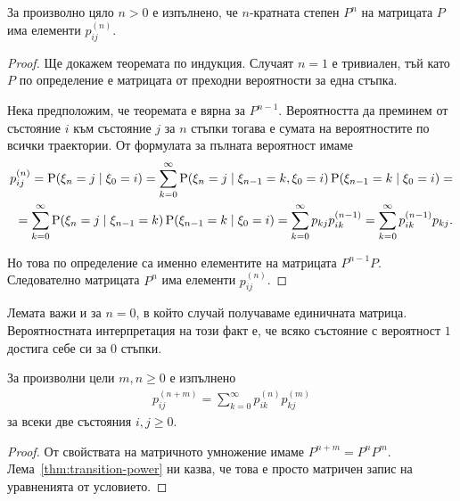 \documentclass[numbers=endperiod, bibliography=totocnumbered]{scrartcl}
\begin{document}
\begin{lemma}\label{thm:transition-power}
  За произволно цяло \( n > 0 \) е изпълнено, че \( n \)-кратната степен \( P^n \) на матрицата \( P \) има елементи \( p_{ij}^{(n)} \).
\end{lemma}
\begin{proof}
  Ще докажем теоремата по индукция. Случаят \( n = 1 \) е тривиален, тъй като \( P \) по определение е матрицата от преходни вероятности за една стъпка.

  Нека предположим, че теоремата е вярна за \( P^{n-1} \). Вероятността да преминем от състояние \( i \) към състояние \( j \) за \( n \) стъпки тогава е сумата на вероятностите по всички траектории. От формулата за пълната вероятност имаме
  \begin{align*}
    p^{(n)}_{ij}
    =
    \operatorname{P}(\xi_n = j \mid \xi_0 = i)
    =
    \sum_{k=0}^\infty \operatorname{P}(\xi_n = j \mid \xi_{n-1} = k, \xi_0 = i) \operatorname{P}(\xi_{n-1} = k \mid \xi_0 = i)
    = \\ =
    \sum_{k=0}^\infty \operatorname{P}(\xi_n = j \mid \xi_{n-1} = k) \operatorname{P}(\xi_{n-1} = k \mid \xi_0 = i)
    =
    \sum_{k=0}^\infty p_{kj} p^{(n-1)}_{ik}
    =
    \sum_{k=0}^\infty p^{(n-1)}_{ik} p_{kj}.
  \end{align*}

  Но това по определение са именно елементите на матрицата \( P^{n-1} P \). Следователно матрицата \( P^n \) има елементи \( p^{(n)}_{ij} \).
\end{proof}

\begin{note}
  Лемата важи и за \( n = 0 \), в който случай получаваме единичната матрица. Вероятностната интерпретация на този факт е, че всяко състояние с вероятност \( 1 \) достига себе си за \( 0 \) стъпки.
\end{note}

\begin{theorem}\label{thm:chapman-kolmogorov}
  За произволни цели \( m, n \geq 0 \) е изпълнено
  \begin{align*}
    p^{(n+m)}_{ij} = \sum_{k=0}^\infty p^{(n)}_{ik} p^{(m)}_{kj}
  \end{align*}
  за всеки две състояния \( i, j \geq 0 \).
\end{theorem}
\begin{proof}
  От свойствата на матричното умножение имаме \( P^{n+m} = P^n P^m \). Лема~\ref{thm:transition-power} ни казва, че това е просто матричен запис на уравненията от условието.
\end{proof}
\end{document}
